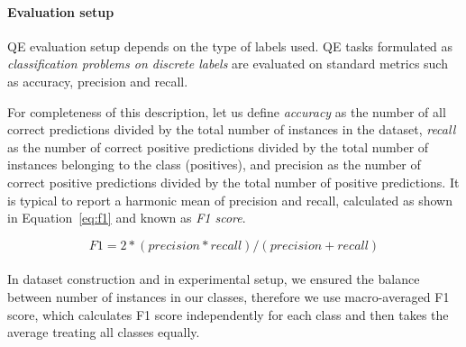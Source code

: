 \paragraph{Evaluation setup} QE evaluation setup depends on the type of labels used. 
QE tasks formulated as \textit{classification problems on discrete labels} are evaluated on standard metrics such as accuracy, precision and recall.


For completeness of this description, let us define \textit{accuracy} as the number of all correct predictions divided by the total number of instances in the dataset, \textit{recall} %
as the number of correct positive predictions divided by the total number of instances belonging to the class (positives), and precision %
as the number of correct positive predictions divided by the total number of positive predictions.
It is typical to report a harmonic mean of precision and recall, calculated as shown in Equation~\ref{eq:f1} and known as \textit{F1 score}. %

\begin{equation}\label{eq:f1}
F1 = 2 * (precision * recall) / (precision + recall)
\end{equation}
\\
In dataset construction and in experimental setup, we ensured the balance between number of instances in our classes, therefore we use macro-averaged F1 score, which calculates F1 score independently for each class and then takes the average treating all classes equally.

